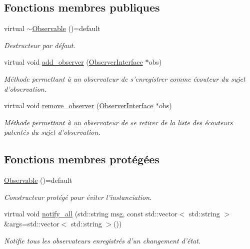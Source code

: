 \subsection*{Fonctions membres publiques}
\begin{DoxyCompactItemize}
\item 
\hypertarget{classObservable_a058acb5a674eba2b96648c66a27440d8}{virtual \hyperlink{classObservable_a058acb5a674eba2b96648c66a27440d8}{$\sim$\+Observable} ()=default}\label{classObservable_a058acb5a674eba2b96648c66a27440d8}

\begin{DoxyCompactList}\small\item\em Destructeur par défaut. \end{DoxyCompactList}\item 
virtual void \hyperlink{classObservable_a4d816915e134f1585a3f4151c6d74b1f}{add\+\_\+observer} (\hyperlink{classObserverInterface}{Observer\+Interface} $\ast$obs)
\begin{DoxyCompactList}\small\item\em Méthode permettant à un observateur de s'enregistrer comme écouteur du sujet d'observation. \end{DoxyCompactList}\item 
virtual void \hyperlink{classObservable_a79bdffc61fbea9b16d00d5bc6a2289ad}{remove\+\_\+observer} (\hyperlink{classObserverInterface}{Observer\+Interface} $\ast$obs)
\begin{DoxyCompactList}\small\item\em Méthode permettant à un observateur de se retirer de la liste des écouteurs patentés du sujet d'observation. \end{DoxyCompactList}\end{DoxyCompactItemize}
\subsection*{Fonctions membres protégées}
\begin{DoxyCompactItemize}
\item 
\hypertarget{classObservable_ab3559b2daa90b06b123089508b3d193d}{\hyperlink{classObservable_ab3559b2daa90b06b123089508b3d193d}{Observable} ()=default}\label{classObservable_ab3559b2daa90b06b123089508b3d193d}

\begin{DoxyCompactList}\small\item\em Constructeur protégé pour éviter l'instanciation. \end{DoxyCompactList}\item 
\hypertarget{classObservable_a0ea369066b16b465fa95c975cd69615a}{virtual void \hyperlink{classObservable_a0ea369066b16b465fa95c975cd69615a}{notify\+\_\+all} (std\+::string msg, const std\+::vector$<$ std\+::string $>$ \&args=std\+::vector$<$ std\+::string $>$())}\label{classObservable_a0ea369066b16b465fa95c975cd69615a}

\begin{DoxyCompactList}\small\item\em Notifie tous les observateurs enregistrés d'un changement d'état. \end{DoxyCompactList}\end{DoxyCompactItemize}
